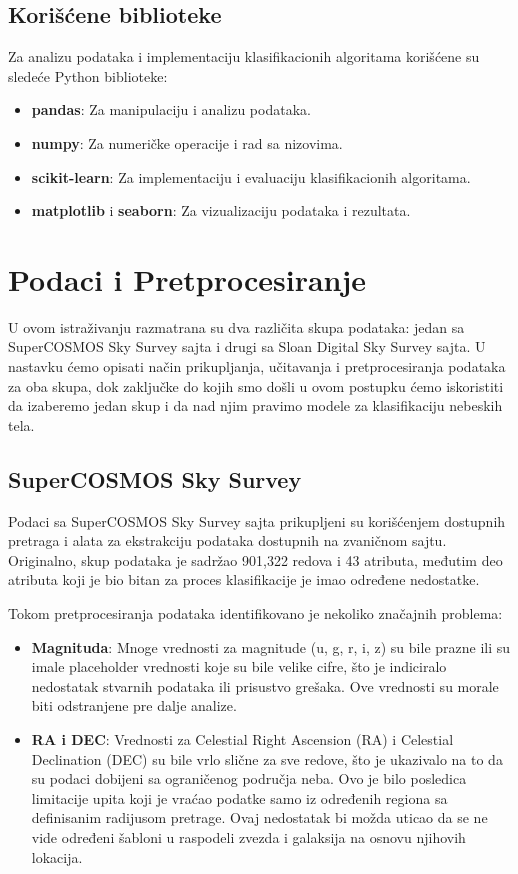 \documentclass[a4paper,12pt]{article}
\begin{document}
\subsection{Korišćene biblioteke}
Za analizu podataka i implementaciju klasifikacionih algoritama korišćene su sledeće Python biblioteke:
\begin{itemize}
    \item \textbf{pandas}: Za manipulaciju i analizu podataka.
    \item \textbf{numpy}: Za numeričke operacije i rad sa nizovima.
    \item \textbf{scikit-learn}: Za implementaciju i evaluaciju klasifikacionih algoritama.
    \item \textbf{matplotlib} i \textbf{seaborn}: Za vizualizaciju podataka i rezultata.
\end{itemize}


\section{Podaci i Pretprocesiranje}
U ovom istraživanju razmatrana su dva različita skupa podataka: jedan sa SuperCOSMOS Sky Survey sajta i drugi sa Sloan Digital Sky Survey sajta. U nastavku ćemo opisati način prikupljanja, učitavanja i pretprocesiranja podataka za oba skupa, dok zaključke do kojih smo došli u ovom postupku ćemo iskoristiti da izaberemo jedan skup i da nad njim pravimo modele za klasifikaciju nebeskih tela.

\subsection{SuperCOSMOS Sky Survey}
Podaci sa SuperCOSMOS Sky Survey sajta prikupljeni su korišćenjem dostupnih pretraga i alata za ekstrakciju podataka dostupnih na zvaničnom sajtu. Originalno, skup podataka je sadržao 901,322 redova i 43 atributa, međutim deo atributa koji je bio bitan za proces klasifikacije je imao određene nedostatke.

Tokom pretprocesiranja podataka identifikovano je nekoliko značajnih problema:
\begin{itemize}
    \item \textbf{Magnituda}: Mnoge vrednosti za magnitude (u, g, r, i, z) su bile prazne ili su imale placeholder vrednosti koje su bile velike cifre, što je indiciralo nedostatak stvarnih podataka ili prisustvo grešaka. Ove vrednosti su morale biti odstranjene pre dalje analize.
    \item \textbf{RA i DEC}: Vrednosti za Celestial Right Ascension (RA) i Celestial Declination (DEC) su bile vrlo slične za sve redove, što je ukazivalo na to da su podaci dobijeni sa ograničenog područja neba. Ovo je bilo posledica limitacije upita  koji je vraćao podatke samo iz određenih regiona sa definisanim radijusom pretrage. Ovaj nedostatak bi možda uticao da se ne vide određeni šabloni u raspodeli zvezda i galaksija na osnovu njihovih lokacija.
\end{itemize}
\end{document}
